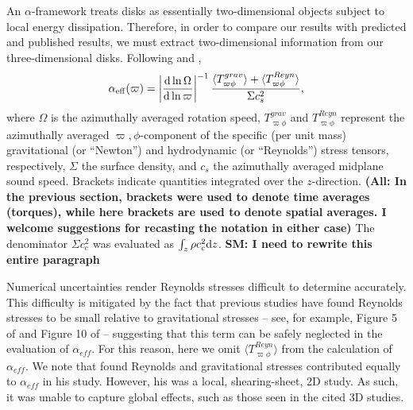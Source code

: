 \documentclass[manuscript]{aastex} %
\begin{document}
An $\alpha$-framework treats disks as essentially two-dimensional objects subject to local energy dissipation.  Therefore, in order to compare our results with predicted and published results, we must extract two-dimensional information from our three-dimensional disks.  Following \cite{gammie2001} and \citet{lodato2004}, 
\begin{equation}
\label{alpha1}
\alpha_{\rm{eff}}(\varpi) = \left| \frac{{\rm d} \ln \Omega}{{\rm d} \ln \varpi} \right|^{-1} 
\frac {\langle T_{\varpi\phi}^{grav}\rangle + \langle T_{\varpi\phi}^{Reyn}\rangle}
{\Sigma c_s^2 },
\end{equation}
where $\Omega$ is the azimuthally averaged rotation speed, $T_{\varpi\phi}^{grav}$ and $T_{\varpi\phi}^{Reyn}$ represent the azimuthally averaged $\varpi,\phi$-component of the specific (per unit mass) gravitational 
(or ``Newton'') and hydrodynamic (or ``Reynolds'') stress tensors, respectively, $\Sigma$ the surface density,
and $c_s$ the azimuthally averaged midplane sound speed.  Brackets indicate quantities integrated over the $z$-direction. 
{\bf (All: In the previous section, brackets were used to denote time averages (torques),  while here brackets are used to denote spatial
averages.  I welcome suggestions for recasting the notation in either case)}
The denominator $\Sigma c_c^2$ was evaluated as $\int_z \rho c_c^2 {\rm d}z$. {\bf SM: I need to rewrite this entire paragraph}
 
  

Numerical uncertainties render Reynolds stresses difficult to determine accurately. 
This difficulty is mitigated by the fact that 
previous studies have found Reynolds stresses to be small relative to gravitational stresses -- see, 
for example, Figure 5 of \cite{lodato2004} and Figure 10 of \cite{boley2006} -- suggesting that this term
can be safely neglected in the evaluation of $\alpha_{eff}$.   For this reason, 
here we omit
$\langle T_{\varpi\phi}^{Reyn}\rangle$ from the calculation of $\alpha_{eff}$. 
We note that \cite{gammie2001}  found
Reynolds and gravitational stresses contributed equally to $\alpha_{eff}$ in his study.  However,
his was a local, shearing-sheet, 2D study.  As such, it was unable to capture global effects, such
as those seen in the cited 3D studies.  
\end{document}
